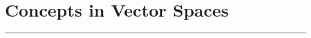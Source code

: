 \documentclass[
10pt, %
a4paper, %
oneside, %
headinclude,footinclude, %
BCOR5mm, %
]{scrartcl}
\begin{document}

\newpage %


\section{Concepts in Vector Spaces}
\hrule
\vspace{0.5cm}
\end{document}
